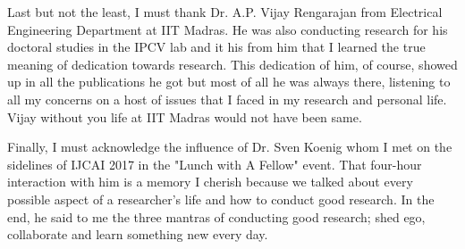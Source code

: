 Last but not the least, I must thank Dr. A.P. Vijay Rengarajan from Electrical Engineering Department at IIT Madras. He was also conducting research for his doctoral studies in the IPCV lab and it his from him that I learned the true meaning of dedication towards research. This dedication of him, of course, showed up in all the publications he got but most of all he was always there, listening to all my concerns on a host of issues that I faced in my research and personal life. Vijay without you life at IIT Madras would not have been same.

Finally, I must acknowledge the influence of Dr. Sven Koenig whom I met on the sidelines of IJCAI 2017 in the "Lunch with  A Fellow" event. That four-hour interaction with him is a memory I cherish because we talked about every possible aspect of a researcher's life and how to conduct good research. In the end, he said to me the three mantras of conducting good research; shed ego, collaborate and learn something new every day.

